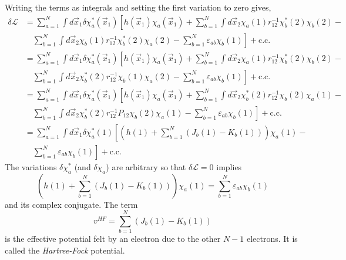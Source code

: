 Writing the terms as integrals and setting the first variation to zero gives,
\[
\begin{aligned}
\delta\mathscr{L} &=
\sum_{a=1}^N\int d\vec{x}_1\delta\chi_a^\ast(\vec{x}_1)\left[h(\vec{x}_1)
\chi_a(\vec{x}_1) + \sum_{b=1}^N\int d\vec{x}_2\chi_a(1)r_{12}^{-1}
\chi_b^\ast(2)\chi_b(2) - \right. \\
&\quad\left.\sum_{b=1}^N\int d\vec{x}_2 \chi_b(1)r_{12}^{-1} \chi_b^\ast(2)\chi_a(2)
- \sum_{b=1}^N \varepsilon_{ab}\chi_b(1) \right] + \text{c.c.}\\
&= \sum_{a=1}^N\int d\vec{x}_1\delta\chi_a^\ast(\vec{x}_1)\left[h(\vec{x}_1)
\chi_a(\vec{x}_1) + \sum_{b=1}^N\int d\vec{x}_2\chi_a(1)r_{12}^{-1}
\chi_b^\ast(2)\chi_b(2) - \right. \\
&\quad\left.\sum_{b=1}^N\int d\vec{x}_2 \chi_b^\ast(2)r_{12}^{-1} \chi_b(1)\chi_a(2)
- \sum_{b=1}^N\varepsilon_{ab}\chi_b(1) \right]+ \text{c.c.} \\
&= \sum_{a=1}^N\int d\vec{x}_1\delta\chi_a^\ast(\vec{x}_1)\left[h(\vec{x}_1)
\chi_a(\vec{x}_1) + \sum_{b=1}^N\int d\vec{x}_2\chi_b^\ast(2)r_{12}^{-1}
\chi_b(2)\chi_a(1) - \right. \\
&\quad\left.\sum_{b=1}^N\int d\vec{x}_2 \chi_b^\ast(2)r_{12}^{-1}P_{12} 
\chi_b(2)\chi_a(1) - 
\sum_{b=1}^N\varepsilon_{ab}\chi_b(1) \right] + \text{c.c.}\\
&= \sum_{a=1}^N\int d\vec{x}_1\delta\chi_a^\ast(1)\left[\left(h(1) + \sum_{b=1}^N(
J_b(1) - K_b(1))\right)\chi_a(1) - \right. \\
&\quad\left.\sum_{b=1}^N\varepsilon_{ab}\chi_b(1) \right] 
+ \text{c.c.}
\end{aligned}
\]
The variations $\delta\chi_a^\ast$ (and $\delta\chi_a$) are arbitrary so that
$\delta\mathscr{L} = 0$ implies
\begin{equation}\label{c3e26}
\left(h(1) + \sum_{b=1}^N( J_b(1) - K_b(1))\right)\chi_a(1) = \sum_{b=1}^N
\varepsilon_{ab}\chi_b(1)
\end{equation}
and its complex conjugate. The term
\begin{equation}\label{c3e27}
v^{HF} = \sum_{b=1}^N( J_b(1) - K_b(1))
\end{equation}
is the effective potential felt by an electron due to the other $N-1$ electrons.
It is called the \emph{Hartree-Fock} potential.

